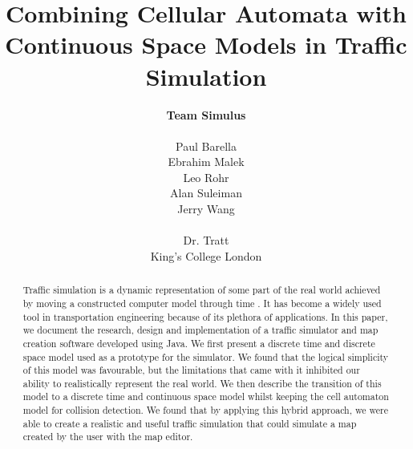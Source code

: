 \documentclass[11pt,a4paper]{article}
\begin{document}
\title{Combining Cellular Automata with Continuous Space Models in Traffic Simulation}
\author{
\textbf{Team Simulus}\\\\
	Paul Barella\\
	Ebrahim Malek\\
	Leo Rohr\\
	Alan Suleiman\\
	Jerry Wang\\\\
	Dr. Tratt\\King's College London}
\maketitle
\begin{abstract}
Traffic simulation is a dynamic representation of some part of the real world achieved by moving a constructed computer model through time \cite{drew1968traffic}. It has become a widely used tool in transportation engineering because of its plethora of applications. In this paper, we document the research, design and implementation of a traffic simulator and  map creation software developed using Java. We first present a discrete time and discrete space model used as a prototype for the simulator. We found that the logical simplicity of this model was favourable, but the limitations that came with it inhibited our ability to realistically represent the real world. We then describe the transition of this model to a discrete time and continuous space model whilst keeping the cell automaton model for collision detection. We found that by applying this hybrid approach, we were able to create a realistic and useful traffic simulation that could simulate a map created by the user with the map editor.
\end{abstract}
\clearpage
\begin{tableofcontents}
\end{tableofcontents}
\clearpage
	
	
	
	
	
	
	

	\fancyfoot[C]{\thepage}
	
	
	
	\appendix
		
	
\end{document}
